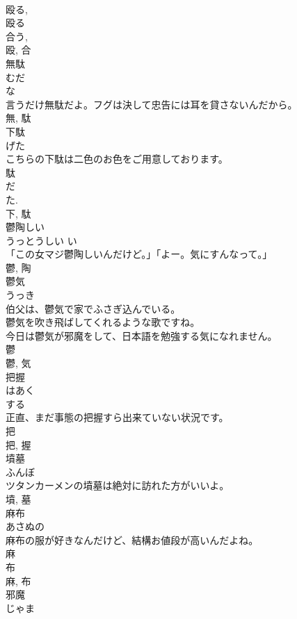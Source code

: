 \documentclass[8pt]{extreport}
\begin{document}
\begin{CJK}{UTF8}{min}
\\	殴る, 
\\	殴る 
\\	合う, 
\\	殴, 合	
\\	無駄	
\\	むだ	
\\	な 
\\	言うだけ無駄だよ。フグは決して忠告には耳を貸さないんだから。	
\\	無, 駄	
\\	下駄	
\\	げた	
\\	こちらの下駄は二色のお色をご用意しております。	
\\	駄 
\\	だ 
\\	た. 
\\	下, 駄	
\\	鬱陶しい	
\\	うっとうしい	い 
\\	「この女マジ鬱陶しいんだけど。」「よー。気にすんなって。」	
\\	鬱, 陶	
\\	鬱気	
\\	うっき	
\\	伯父は、鬱気で家でふさぎ込んでいる。	
\\	鬱気を吹き飛ばしてくれるような歌ですね。	
\\	今日は鬱気が邪魔をして、日本語を勉強する気になれません。	
\\	鬱 
\\	鬱, 気	
\\	把握	
\\	はあく	
\\	する 
\\	正直、まだ事態の把握すら出来ていない状況です。	
\\	把 
\\	把, 握	
\\	墳墓	
\\	ふんぼ	
\\	ツタンカーメンの墳墓は絶対に訪れた方がいいよ。	
\\	墳, 墓	
\\	麻布	
\\	あさぬの	
\\	麻布の服が好きなんだけど、結構お値段が高いんだよね。	
\\	麻 
\\	布 
\\	麻, 布	
\\	邪魔	
\\	じゃま	

\end{CJK}
\end{document}
